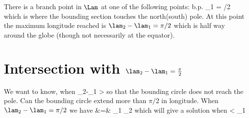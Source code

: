 \documentclass[preprint,12pt]{article}
\begin{document}
There is a branch point  in $\Lam$ at one of the following points:
\be
{\rm b.p.} \quad \vphi_1 \pm {} = \pm \pi/2
\ee
which is where the bounding section touches the north(south) pole. At this point the maximum longitude reached is $\lam_2-\lam_1 = \pi/2$ which is half way around the globe (though not necessarily at the equator).


\section{Intersection with $\lam_2-\lam_1 = \frac{\pi}{2}$}

We want to know, when 
\be
\varphi_2-\varphi_1 > 
\ee
so that the bounding circle does not reach the pole. Can the bounding circle extend more than  $\pi/2$ in longitude.
When $\lam_2-\lam_1 = \pi/2$ we have
 \bea
\cos {} &=& \sin \vphi_1 \sin \vphi_2 
 \eea
 which will give a solution when
 \be
 \cos {}< \sin\vphi_1
 \ee
 


\end{document}
